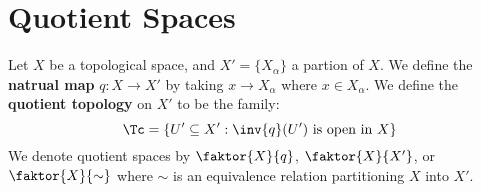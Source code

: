 
\section{Quotient Spaces}

\begin{definition}
    Let $X$ be a topological space, and  $X'=\{X_\alpha\}$ a partion of $X$. We
    define the \textbf{natrual map} $q:X \xrightarrow{} X'$ by taking $x
    \xrightarrow{} X_\alpha$ where $x \in X_\alpha$. We define the  \textbf{quotient
    topology} on $X'$ to be the family:
    \begin{equation*}
        \Tc = \{U' \subseteq X' : \inv{q}(U') \text{ is open in } X\}
    \end{equation*}
    We denote quotient spaces by $\faktor{X}{q}$, $\faktor{X}{X'}$, or
    $\faktor{X}{\sim}$ where $\sim$ is an equivalence relation partitioning  $X$
    into  $X'$.
\end{definition}

